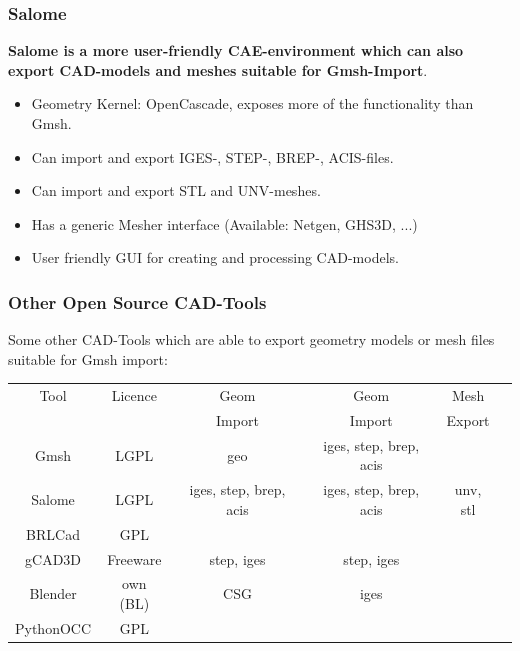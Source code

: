 \begin{frame}
  \frametitle{Salome}
  \textbf{Salome is a more user-friendly CAE-environment which can also export
  CAD-models and meshes suitable for Gmsh-Import}.
  \begin{itemize}
    \item Geometry Kernel: OpenCascade, exposes more of the functionality than Gmsh.
    \item Can import and export IGES-, STEP-, BREP-, ACIS-files.
    \item Can import and export STL and UNV-meshes.
    \item Has a generic Mesher interface (Available: Netgen, GHS3D, ...)
    \item User friendly GUI for creating and processing CAD-models.
  \end{itemize}
\end{frame}

\begin{frame}
  \frametitle{Other Open Source CAD-Tools}
    Some other CAD-Tools which are able to export geometry models or mesh
    files suitable for Gmsh import:
    \begin{center}
      \small
      \begin{tabular}{|c|c|c|c|c|c|}
        \hline
        Tool & Licence & Geom & Geom & Mesh
        \\
        &  & Import & Import & Export
        \\
        \hline
        \hline
        Gmsh & LGPL & geo & iges, step, brep, acis &
        \\
        \hline
        Salome & LGPL & iges, step, brep, acis & iges, step, brep, acis & unv,
        stl
        \\
        \hline
        BRLCad & GPL &  &  &
        \\
        \hline
        gCAD3D & Freeware & step, iges & step, iges &
        \\
        \hline
        Blender & own (BL) & CSG & iges &
        \\
        \hline
        PythonOCC & GPL & &  &
        \\
        \hline
      \end{tabular}
    \end{center}
\end{frame}

\cleardoublepage
